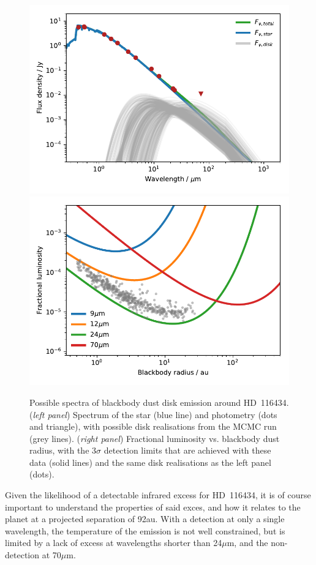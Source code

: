 \documentclass[a4paper,fleqn,usenatbib]{mnras}
\begin{document}
\begin{figure}
  \includegraphics[width=\columnwidth]{sed.pdf}
  \includegraphics[width=\columnwidth]{f_r.pdf}
  \caption{Possible spectra of blackbody dust disk emission around
    HD~116434. (\emph{left panel}) Spectrum of the star (blue line) and
    photometry (dots and triangle), with possible disk realisations from
    the MCMC run (grey lines). (\emph{right panel}) Fractional
    luminosity vs. blackbody dust radius, with the 3$\sigma$ detection
    limits that are achieved with these data (solid lines) and the same
    disk realisations as the left panel (dots).}
    \label{fig:sed}
\end{figure}

Given the likelihood of a detectable infrared excess for HD~116434, it
is of course important to understand the properties of said exces, and
how it relates to the planet at a projected separation of 92au. With a
detection at only a single wavelength, the temperature of the emission
is not well constrained, but is limited by a lack of excess at
wavelengths shorter than 24$\mu$m, and the non-detection at 70$\mu$m.
\end{document}

